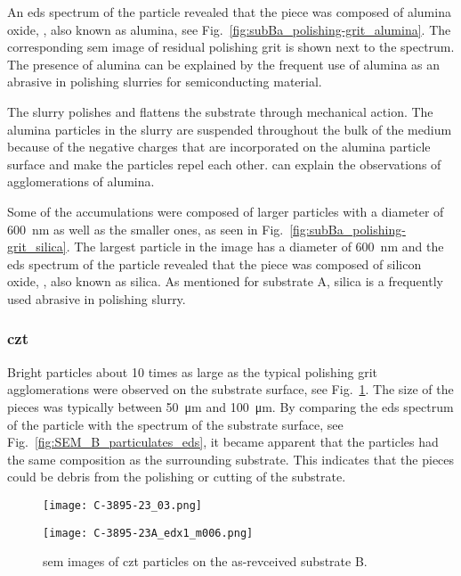 An \ac{eds} spectrum of the particle revealed that the piece was composed of alumina oxide, , also known as alumina, see Fig.~\ref{fig:subBa_polishing-grit_alumina}. The corresponding \ac{sem} image of residual polishing grit is shown next to the spectrum. The presence of alumina can be explained by the frequent use of alumina as an abrasive in polishing slurries for semiconducting material.

The slurry polishes and flattens the substrate through mechanical action. The alumina particles in the slurry are suspended throughout the bulk of the medium because of the negative charges that are incorporated on the alumina particle surface and make the particles repel each other.  can explain the observations of agglomerations of alumina.

Some of the accumulations were composed of larger particles with a diameter of \SI{600}{\nano\metre} as well as the smaller ones, as seen in Fig.~\ref{fig:subBa_polishing-grit_silica}. The largest particle in the image has a diameter of \SI{600}{\nano\metre} and the \ac{eds} spectrum of the particle revealed that the piece was composed of silicon oxide, , also known as silica. As mentioned for substrate A, silica is a frequently used abrasive in polishing slurry.

\subsubsection{\Ac{czt}}
Bright particles about 10 times as large as the typical polishing grit agglomerations were observed on the substrate surface, see Fig.~\ref{fig:SEM_B_particulates}. The size of the pieces was typically between \SI{50}{\micro\metre} and \SI{100}{\micro\metre}. By comparing the \ac{eds} spectrum of the particle with the spectrum of the substrate surface, see Fig.~\ref{fig:SEM_B_particulates_eds}, it became apparent that the particles had the same composition as the surrounding substrate. This indicates that the pieces could be debris from the polishing or cutting of the substrate.

\begin{figure}[htbp]
    \centering
          \begin{minipage}[t]{0.49\linewidth}
            \centering
            \texttt{[image: C-3895-23\_03.png]}
          \end{minipage}
          \hfill
          \begin{minipage}[t]{0.49\linewidth}
            \centering
            \texttt{[image: C-3895-23A\_edx1\_m006.png]}
          \end{minipage}
        \caption[\Ac{sem} images of \ac{czt} particles on as-revceived substrate B.]{\Ac{sem} images of \ac{czt} particles on the as-revceived substrate B.}\label{fig:SEM_B_particulates}  
\end{figure}


